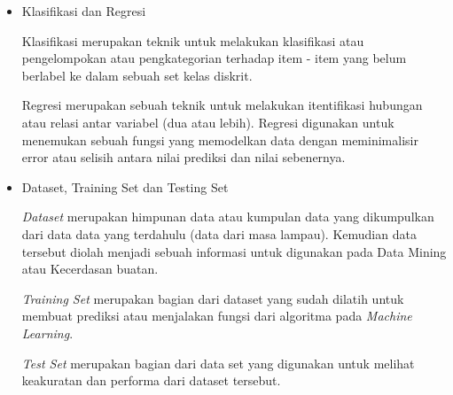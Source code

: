\begin{enumerate}
\begin{itemize}
		      \item Klasifikasi dan Regresi
		            \par \setlength{\parindent}{5ex}
		            Klasifikasi merupakan teknik untuk melakukan klasifikasi atau pengelompokan atau pengkategorian terhadap item - item yang belum berlabel ke dalam sebuah set kelas diskrit.
		            \par Regresi merupakan sebuah teknik untuk melakukan itentifikasi hubungan atau relasi antar variabel (dua atau lebih). Regresi digunakan untuk menemukan sebuah fungsi yang memodelkan data dengan meminimalisir error atau selisih antara nilai prediksi dan nilai sebenernya.

		      \item Dataset, Training Set dan Testing Set
		            \par \setlength{\parindent}{5ex}
		            \emph{Dataset} merupakan himpunan data atau kumpulan data yang dikumpulkan dari data data yang terdahulu (data dari masa lampau). Kemudian data tersebut diolah menjadi sebuah informasi untuk digunakan pada Data Mining atau Kecerdasan buatan.
		            \par \emph{Training Set} merupakan bagian dari dataset yang sudah dilatih untuk membuat prediksi atau menjalakan fungsi dari algoritma pada \emph{Machine Learning}.
		            \par \emph{Test Set} merupakan bagian dari data set yang digunakan untuk melihat keakuratan dan performa dari dataset tersebut.

	      \end{itemize}
\end{enumerate}

